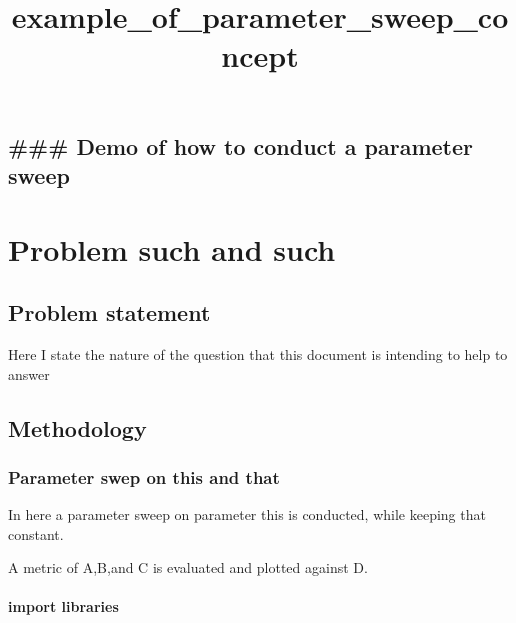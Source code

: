 \documentclass[11pt]{article}
\title{example\_of\_parameter\_sweep\_concept}
\begin{document}
    
    
    \maketitle
    
    

    
    \hypertarget{demo-of-how-to-conduct-a-parameter-sweep}{%
\subsection{\#\#\# Demo of how to conduct a parameter
sweep}\label{demo-of-how-to-conduct-a-parameter-sweep}}

    \hypertarget{problem-such-and-such}{%
\section{Problem such and such}\label{problem-such-and-such}}

\hypertarget{problem-statement}{%
\subsection{Problem statement}\label{problem-statement}}

Here I state the nature of the question that this document is intending
to help to answer

\hypertarget{methodology}{%
\subsection{Methodology}\label{methodology}}

\hypertarget{parameter-swep-on-this-and-that}{%
\subsubsection{Parameter swep on this and
that}\label{parameter-swep-on-this-and-that}}

In here a parameter sweep on parameter this is conducted, while keeping
that constant.

A metric of A,B,and C is evaluated and plotted against D.

    \hypertarget{import-libraries}{%
\paragraph{import libraries}\label{import-libraries}}
\end{document}
